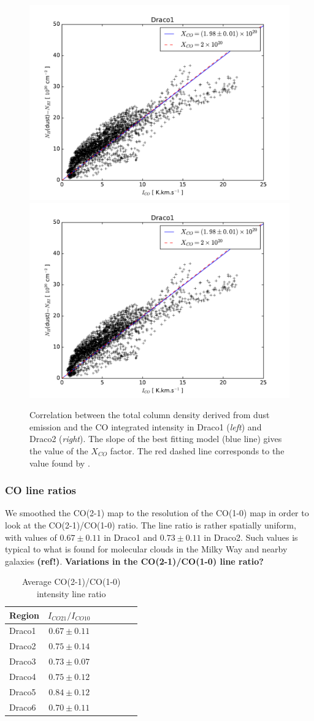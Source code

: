 \documentclass[traditabstract]{aa}
\begin{document}
\begin{figure}[h!]
  \centering
  \includegraphics[page=1,width=0.48\linewidth,trim=30 10 50 30,clip=true]{Figures/dust-CO_comparison.pdf}
  \hspace{3mm}
  \includegraphics[page=2,width=0.48\linewidth,trim=30 10 50 30,clip=true]{Figures/dust-CO_comparison.pdf}
  \caption{\label{Xco} Correlation between the total column density derived from dust emission and the CO integrated intensity in Draco1 (\emph{left}) and Draco2 (\emph{right}). The slope of the best fitting model (blue line) gives the value of the $X_{CO}$ factor. The red dashed line corresponds to the value found by \cite{Moritz_1998}.}
\end{figure}


\subsubsection{CO line ratios}

We smoothed the CO(2-1) map to the resolution of the CO(1-0) map in order to look at the CO(2-1)/CO(1-0) ratio. The line ratio is rather spatially uniform, with values of $0.67\pm 0.11$ in Draco1 and $0.73\pm 0.11$ in Draco2. Such values is typical to what is found for molecular clouds in the Milky Way and nearby galaxies \textbf{(ref!)}. \textbf{Variations in the CO(2-1)/CO(1-0) line ratio?}

\begin{table}[h]
  \centering
  \footnotesize
  \caption{Average CO(2-1)/CO(1-0) intensity line ratio}
  \begin{tabular}{lcccccc}
    \hline \hline
    Region & $I_{CO21}/I_{CO10}$ \\ \hline
    Draco1 &   $0.67\pm 0.11$    \\
    Draco2 &   $0.75\pm 0.14$    \\
    Draco3 &   $0.73\pm 0.07$    \\
    Draco4 &   $0.75\pm 0.12$    \\
    Draco5 &   $0.84\pm 0.12$    \\
    Draco6 &   $0.70\pm 0.11$    \\ \hline
  \end{tabular}
\end{table}
\end{document}
